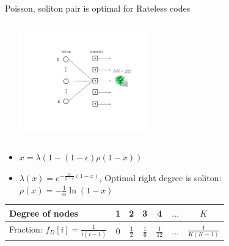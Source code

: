 \documentclass[10pt,xcolor=table]{beamer}
\begin{document}
\begin{frame}{Poisson, soliton pair is optimal for Rateless codes}
\vspace{-3mm}
\begin{columns}
\begin{center}
\scalebox{0.45}{}
\end{center}
\begin{center}
  \includegraphics[width=2.2in]{./Figures/ratelesserasures3}
\end{center}
\end{columns}
\begin{itemize}
  \item   $x = \lambda(1-(1-\epsilon)\rho(1-x))$
  \item $\lambda(x) = e^{-\frac{\alpha}{1-\epsilon}(1-x)}$, \alert{Optimal right degree is soliton: $\rho(x) = -\frac{1}{\alpha}\ln(1-x)$}
\end{itemize}
\begin{center}
\begin{tabular}{|l|c|c|c|c|c|c|}
\hline
Degree of nodes & 1 & 2 & 3 & 4 & $\ldots$ & $K$ \\
\hline
Fraction: \alert{ $f_D[i] = \frac{1}{i(i-1)}$ } & 0 & $\frac12$ & $\frac16$ & $\frac{1}{12}$ & $\ldots$ & $\frac{1}{K (K-1)}$ \\
\hline
\end{tabular}
\end{center}
\end{frame}
\end{document}
